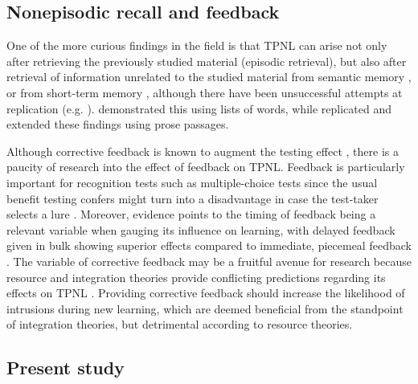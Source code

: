 \documentclass[../main.tex]{subfiles}
\begin{document}
\hypertarget{nonepisodic}{%
\subsection{Nonepisodic recall and feedback}}

One of the more curious findings in the field is that TPNL can arise not 
only after retrieving the previously studied material (episodic retrieval), 
but also after retrieval of information unrelated to the studied material 
from semantic memory \citep{divisRetrievalSpeedsContext2014, 
pastotterRetrievalLearningFacilitates2011}, or from short-term memory 
\citep{pastotterRetrievalLearningFacilitates2011}, although there have been 
unsuccessful attempts at replication (e.g. 
\citealp{weinsteinNotAllRetrieval2015}). 
\cite{pastotterRetrievalLearningFacilitates2011} demonstrated this using 
lists of words, while \cite{divisRetrievalSpeedsContext2014} replicated and 
extended these findings using prose passages.

Although corrective feedback is known to augment the testing effect 
\citep{roedigeriiiCriticalRoleRetrieval2011}, there is a paucity of research 
into the effect of feedback on TPNL. Feedback is particularly important for 
recognition tests such as multiple-choice tests since the usual benefit 
testing confers might turn into a disadvantage in case the test-taker 
selects a lure \citep{roedigerPositiveNegativeConsequences2005, 
marshMemorialConsequencesMultiplechoice2007}. Moreover, evidence points to 
the timing of feedback being a relevant variable when gauging its influence 
on learning, with delayed feedback given in bulk showing superior effects 
compared to immediate, piecemeal feedback 
\citep{metcalfeDelayedImmediateFeedback2009,butlerEffectTypeTiming2007, 
butlerFeedbackEnhancesPositive2008,smithLearningFeedbackSpacing2010}.
The variable of corrective feedback may be a fruitful avenue for research 
because resource and integration theories provide conflicting predictions 
regarding its effects on TPNL \citep{chanRetrievalPotentiatesNew2018}. 
Providing corrective feedback should increase the likelihood of intrusions 
during new learning, which are deemed beneficial from the standpoint of 
integration theories, but detrimental according to resource theories.


\subsection{Present study\label{present}}
\end{document}
